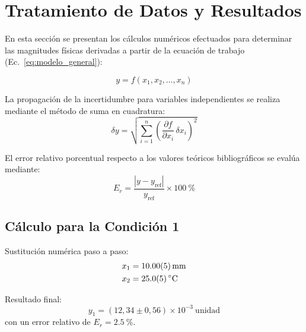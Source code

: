 
\section{Tratamiento de Datos y Resultados}
\label{sec:tratamiento}

En esta sección se presentan los cálculos numéricos efectuados para determinar las magnitudes físicas derivadas a partir de la ecuación de trabajo (Ec.~\eqref{eq:modelo_general}):

\begin{equation}
    y = f(x_1, x_2, \dots, x_n)
    \label{eq:trabajo_calculo}
\end{equation}

La propagación de la incertidumbre para variables independientes se realiza mediante el método de suma en cuadratura:
\begin{equation}
    \delta y = \sqrt{\sum_{i=1}^n \left( \frac{\partial f}{\partial x_i}\,\delta x_i \right)^2}
    \label{eq:propagacion_cuadratura}
\end{equation}

El error relativo porcentual respecto a los valores teóricos bibliográficos se evalúa mediante:
\begin{equation}
    E_r = \frac{|y - y_{\text{ref}}|}{y_{\text{ref}}} \times \qty{100}{\percent}
    \label{eq:error_relativo}
\end{equation}

\subsection{Cálculo para la Condición 1}

Sustitución numérica paso a paso:
\begin{align*}
    x_1 &= \qty{10,00 \pm 0,05}{\milli\meter} \\
    x_2 &= \qty{25,0 \pm 0,5}{\celsius}
\end{align*}

Resultado final:
\begin{equation}
    y_1 = (12{,}34 \pm 0{,}56) \times 10^{-3}\ \text{unidad}
    \label{eq:res_1}
\end{equation}
con un error relativo de $E_r = \qty{2,5}{\percent}$.
